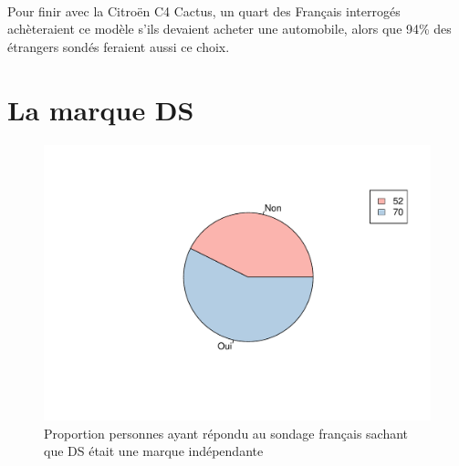 \documentclass[12pt]{article}\usepackage[]{graphicx}\usepackage[]{color}
\makeatletter
\def\maxwidth{ %
  \ifdim\Gin@nat@width>\linewidth
    \linewidth
  \else
    \Gin@nat@width
  \fi
}
\newenvironment{knitrout}{}{} %
\makeatother
\begin{document}
\paragraph{} Pour finir avec la Citroën C4 Cactus, un quart des Français
interrogés achèteraient ce modèle s'ils devaient acheter une automobile, alors
que 94\% des étrangers sondés feraient aussi ce choix.

\break
\section{La marque DS}

\begin{knitrout}
\color{fgcolor}\begin{figure}[H]
\includegraphics[width=\maxwidth]{figure/ds_know_fr-1} \caption[Proportion personnes ayant répondu au sondage français sachant que DS était une marque indépendante]{Proportion personnes ayant répondu au sondage français sachant que DS était une marque indépendante}\label{fig:ds know fr}
\end{figure}


\end{knitrout}
\end{document}
